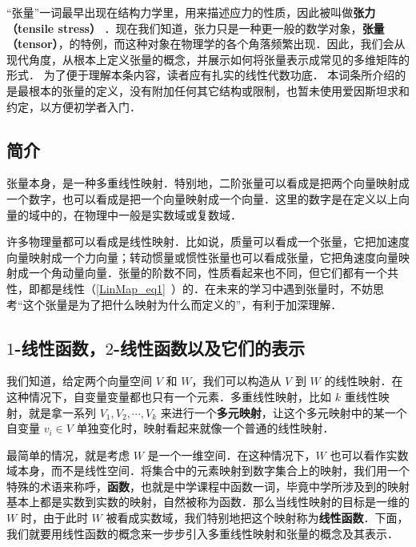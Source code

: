 


“张量”一词最早出现在结构力学里，用来描述应力的性质，因此被叫做\textbf{张力（tensile stress）}%
．现在我们知道，张力只是一种更一般的数学对象，\textbf{张量（tensor）}，的特例，而这种对象在物理学的各个角落频繁出现．因此，我们会从现代角度，从根本上定义张量的概念，并展示如何将张量表示成常见的多维矩阵的形式． 为了便于理解本条内容，读者应有扎实的线性代数功底． 本词条所介绍的是最根本的张量的定义，没有附加任何其它结构或限制，也暂未使用爱因斯坦求和约定，以方便初学者入门．

\subsection{简介}

张量本身，是一种多重线性映射．特别地，二阶张量可以看成是把两个向量映射成一个数字，也可以看成是把一个向量映射成一个向量．这里的数字是在定义以上向量的域中的，在物理中一般是实数域或复数域．

许多物理量都可以看成是线性映射．比如说，质量可以看成一个张量，它把加速度向量映射成一个力向量；转动惯量或惯性张量也可以看成张量，它把角速度向量映射成一个角动量向量．张量的阶数不同，性质看起来也不同，但它们都有一个共性，即都是线性（\autoref{LinMap_eq1}~）的．在未来的学习中遇到张量时，不妨思考“这个张量是为了把什么映射为什么而定义的”，有利于加深理解．

\subsection{$1$-线性函数，$2$-线性函数以及它们的表示}\label{Tensor_sub1}

我们知道，给定两个向量空间 $V$ 和 $W$，我们可以构造从 $V$ 到 $W$ 的线性映射．在这种情况下，自变量变量都也只有一个元素．多重线性映射，比如 $k$ 重线性映射，就是拿一系列 $V_1, V_2, \cdots, V_k$ 来进行一个\textbf{多元映射}，让这个多元映射中的某一个自变量 ${v}_i\in V$ 单独变化时，映射看起来就像一个普通的线性映射．

最简单的情况，就是考虑 $W$ 是一个一维空间．在这种情况下，$W$ 也可以看作实数域本身，而不是线性空间．将集合中的元素映射到数字集合上的映射，我们用一个特殊的术语来称呼，\textbf{函数}，也就是中学课程中函数一词，毕竟中学所涉及到的映射基本上都是实数到实数的映射，自然被称为函数．那么当线性映射的目标是一维的 $W$ 时，由于此时 $W$ 被看成实数域，我们特别地把这个映射称为\textbf{线性函数}．下面，我们就要用线性函数的概念来一步步引入多重线性映射和张量的概念及其表示．

